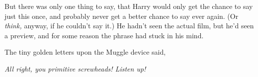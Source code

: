 But there was only one thing to say, that Harry would only get the chance to
say just this once, and probably never get a better chance to say ever again.
(Or \emph{think,} anyway, if he couldn't say it.) He hadn't seen the actual
film, but he'd seen a preview, and for some reason the phrase had stuck in his
mind.

The tiny golden letters upon the Muggle device said,

\emph{All right, you primitive screwheads! Listen up!}
